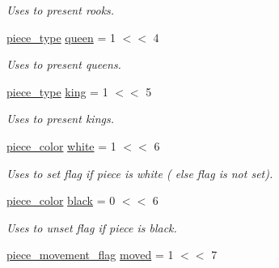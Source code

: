 \begin{DoxyCompactItemize}
\begin{DoxyCompactList}\small\item\em Uses to present rooks. \item\end{DoxyCompactList}\item 
\hypertarget{namespaceChEngn_a97924767720e8ba4e595ad9f161d73e8}{
\hyperlink{namespaceChEngn_a2a35c185f259757a78e937575b8ed483}{piece\_\-type} \hyperlink{namespaceChEngn_a97924767720e8ba4e595ad9f161d73e8}{queen} = 1 $<$$<$ 4}
\label{namespaceChEngn_a97924767720e8ba4e595ad9f161d73e8}

\begin{DoxyCompactList}\small\item\em Uses to present queens. \item\end{DoxyCompactList}\item 
\hypertarget{namespaceChEngn_a40c2dbaf0963b46704f08ffb28364cea}{
\hyperlink{namespaceChEngn_a2a35c185f259757a78e937575b8ed483}{piece\_\-type} \hyperlink{namespaceChEngn_a40c2dbaf0963b46704f08ffb28364cea}{king} = 1 $<$$<$ 5}
\label{namespaceChEngn_a40c2dbaf0963b46704f08ffb28364cea}

\begin{DoxyCompactList}\small\item\em Uses to present kings. \item\end{DoxyCompactList}\item 
\hypertarget{namespaceChEngn_aa3212b290980eb5db7f91e88f8803a9c}{
\hyperlink{namespaceChEngn_a9c81426c0134a97288a226c122daf62f}{piece\_\-color} \hyperlink{namespaceChEngn_aa3212b290980eb5db7f91e88f8803a9c}{white} = 1 $<$$<$ 6}
\label{namespaceChEngn_aa3212b290980eb5db7f91e88f8803a9c}

\begin{DoxyCompactList}\small\item\em Uses to set flag if piece is white ( else flag is not set). \item\end{DoxyCompactList}\item 
\hypertarget{namespaceChEngn_aa2bfc6fe87969d3e28eecbb682e802c8}{
\hyperlink{namespaceChEngn_a9c81426c0134a97288a226c122daf62f}{piece\_\-color} \hyperlink{namespaceChEngn_aa2bfc6fe87969d3e28eecbb682e802c8}{black} = 0 $<$$<$ 6}
\label{namespaceChEngn_aa2bfc6fe87969d3e28eecbb682e802c8}

\begin{DoxyCompactList}\small\item\em Uses to unset flag if piece is black. \item\end{DoxyCompactList}\item 
\hypertarget{namespaceChEngn_a2997c391593541b72a894e9cf44c90bf}{
\hyperlink{namespaceChEngn_a491b2eba2f766087f4f28948005ab16a}{piece\_\-movement\_\-flag} \hyperlink{namespaceChEngn_a2997c391593541b72a894e9cf44c90bf}{moved} = 1 $<$$<$ 7}
\label{namespaceChEngn_a2997c391593541b72a894e9cf44c90bf}


\end{DoxyCompactItemize}
